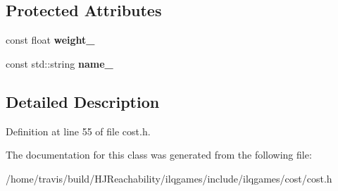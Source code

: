 \subsection*{Protected Attributes}
\begin{DoxyCompactItemize}
\item 
const float {\bfseries weight\+\_\+}\hypertarget{classilqgames_1_1_cost_a9d23ad75587bd930e9d63bd53532f688}{}\label{classilqgames_1_1_cost_a9d23ad75587bd930e9d63bd53532f688}

\item 
const std\+::string {\bfseries name\+\_\+}\hypertarget{classilqgames_1_1_cost_a36d7d9ee9585912fc98fca10d9c81614}{}\label{classilqgames_1_1_cost_a36d7d9ee9585912fc98fca10d9c81614}

\end{DoxyCompactItemize}


\subsection{Detailed Description}


Definition at line 55 of file cost.\+h.



The documentation for this class was generated from the following file\+:\begin{DoxyCompactItemize}
\item 
/home/travis/build/\+H\+J\+Reachability/ilqgames/include/ilqgames/cost/cost.\+h\end{DoxyCompactItemize}
